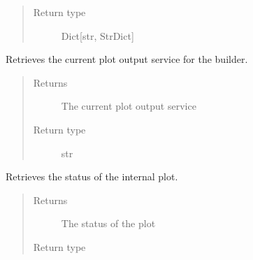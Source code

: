 \documentclass[letterpaper,10pt,english]{sphinxmanual}
\begin{document}
\begin{fulllineitems}
\begin{fulllineitems}
\begin{quote}
\begin{description}
\item[{Return type}] \leavevmode
\sphinxAtStartPar
Dict{[}str, StrDict{]}

\end{description}\end{quote}

\end{fulllineitems}


\begin{fulllineitems}
\label{\detokenize{builder:geohexviz.builder.PlotBuilder.get_plot_output_service}}
\sphinxAtStartPar
Retrieves the current plot output service for the builder.
\begin{quote}\begin{description}
\item[{Returns}] \leavevmode
\sphinxAtStartPar
The current plot output service

\item[{Return type}] \leavevmode
\sphinxAtStartPar
str

\end{description}\end{quote}

\end{fulllineitems}


\begin{fulllineitems}
\label{\detokenize{builder:geohexviz.builder.PlotBuilder.get_plot_status}}
\sphinxAtStartPar
Retrieves the status of the internal plot.
\begin{quote}\begin{description}
\item[{Returns}] \leavevmode
\sphinxAtStartPar
The status of the plot

\item[{Return type}] \leavevmode
\sphinxAtStartPar
{\hyperref[\detokenize{builder:geohexviz.builder.PlotStatus}]{}}


\end{description}
\end{quote}
\end{fulllineitems}
\end{fulllineitems}
\end{document}
